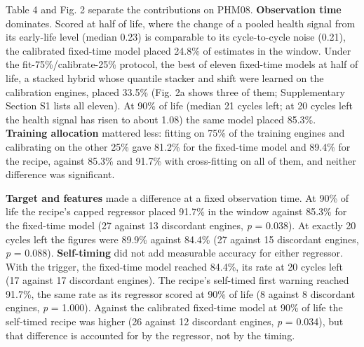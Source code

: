 \documentclass[a4paper,fleqn,doubleblind]{cas-dc}
\begin{document}
\begin{table}[!tbp]
\begin{tabular}
\bottomrule
\end{tabular}\par{}
\end{table}

Table 4 and Fig. 2 separate the contributions on PHM08. \textbf{Observation time} dominates. Scored at half of life, where the change of a pooled health signal from its early-life level (median 0.23) is comparable to its cycle-to-cycle noise (0.21), the calibrated fixed-time model placed 24.8\% of estimates in the window. Under the fit-75\%/calibrate-25\% protocol, the best of eleven fixed-time models at half of life, a stacked hybrid whose quantile stacker and shift were learned on the calibration engines, placed 33.5\% (Fig. 2a shows three of them; Supplementary Section S1 lists all eleven). At 90\% of life (median 21 cycles left; at 20 cycles left the health signal has risen to about 1.08) the same model placed 85.3\%. \textbf{Training allocation} mattered less: fitting on 75\% of the training engines and calibrating on the other 25\% gave 81.2\% for the fixed-time model and 89.4\% for the recipe, against 85.3\% and 91.7\% with cross-fitting on all of them, and neither difference was significant.

\textbf{Target and features} made a difference at a fixed observation time. At 90\% of life the recipe's capped regressor placed 91.7\% in the window against 85.3\% for the fixed-time model (27 against 13 discordant engines, \textit{p} = 0.038). At exactly 20 cycles left the figures were 89.9\% against 84.4\% (27 against 15 discordant engines, \textit{p} = 0.088). \textbf{Self-timing} did not add measurable accuracy for either regressor. With the trigger, the fixed-time model reached 84.4\%, its rate at 20 cycles left (17 against 17 discordant engines). The recipe's self-timed first warning reached 91.7\%, the same rate as its regressor scored at 90\% of life (8 against 8 discordant engines, \textit{p} = 1.000). Against the calibrated fixed-time model at 90\% of life the self-timed recipe was higher (26 against 12 discordant engines, \textit{p} = 0.034), but that difference is accounted for by the regressor, not by the timing.
\end{document}
